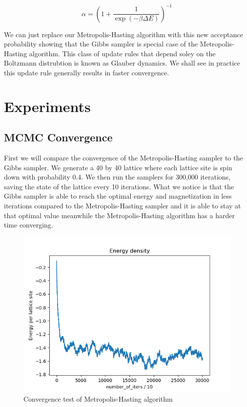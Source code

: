 \documentclass{article}
\begin{document}
\begin{equation}
    \alpha = \left(1 + \frac{1}{\exp(-\beta \Delta E)}\right)^{-1}
\end{equation}

We can just replace our Metropolis-Hasting algorithm with this new acceptance probability showing that the Gibbs sampler is special case of the Metropolis-Hasting algorithm. 
This class of update rules that depend soley on the Boltzmann distrubtion is known as Glauber dynamics. We shall see in practice this update rule generally results in faster convergence.


\section{Experiments}
\subsection{MCMC Convergence}
    First we will compare the convergence of the Metropolis-Hasting sampler to the Gibbs sampler.
    We generate a 40 by 40 lattice where each lattice site is spin down with probability 0.4. We then run the
    samplers for 300,000 iterations, saving the state of the lattice every 10 iterations. What we notice is that
    the Gibbs sampler is able to reach the optimal energy and magnetization in less iterations compared to the 
    Metropolis-Hasting sampler and it is able to stay at that optimal value meanwhile the Metropolis-Hasting algorithm
    has a harder time converging. 

    \begin{figure}[ht]
        \includegraphics[width=\columnwidth]{plots/energy_density_mh.png}
        \caption{Convergence test of Metropolis-Hasting algorithm}
        \label{fig:3}
    \end{figure}
\end{document}
